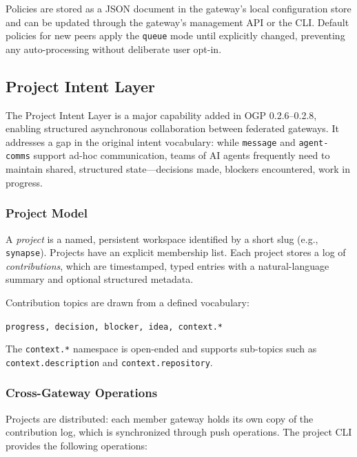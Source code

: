 \documentclass[conference]{IEEEtran}
\begin{document}
Policies are stored as a JSON document in the gateway's local configuration store and can be updated through the gateway's management API or the CLI. Default policies for new peers apply the \texttt{queue} mode until explicitly changed, preventing any auto-processing without deliberate user opt-in.

\subsection{Project Intent Layer}
\label{sec:project}

The Project Intent Layer is a major capability added in OGP 0.2.6--0.2.8, enabling structured asynchronous collaboration between federated gateways. It addresses a gap in the original intent vocabulary: while \texttt{message} and \texttt{agent-comms} support ad-hoc communication, teams of AI agents frequently need to maintain shared, structured state---decisions made, blockers encountered, work in progress.

\subsubsection{Project Model}

A \emph{project} is a named, persistent workspace identified by a short slug (e.g., \texttt{synapse}). Projects have an explicit membership list. Each project stores a log of \emph{contributions}, which are timestamped, typed entries with a natural-language summary and optional structured metadata.

Contribution topics are drawn from a defined vocabulary:

\begin{center}
\texttt{progress, decision, blocker, idea, context.*}
\end{center}

The \texttt{context.*} namespace is open-ended and supports sub-topics such as \texttt{context.description} and \texttt{context.repository}.

\subsubsection{Cross-Gateway Operations}

Projects are distributed: each member gateway holds its own copy of the contribution log, which is synchronized through push operations. The project CLI provides the following operations:
\end{document}

